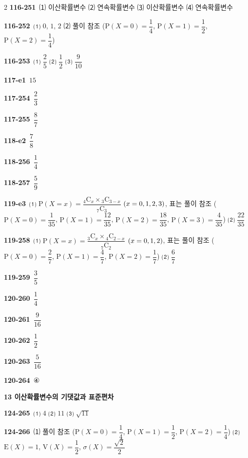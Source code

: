 \documentclass[10pt,a4paper]{article}
\begin{document}
\begin{multicols}{2}
\noindent\textbf{116-251}\ ⑴ 이산확률변수 ⑵ 연속확률변수 ⑶ 이산확률변수 ⑷ 연속확률변수\par
\noindent\textbf{116-252}\ ⑴ $0$, $1$, $2$ ⑵ 풀이 참조 ($\mathrm{P}(X=0)=\dfrac{1}{4}$, $\mathrm{P}(X=1)=\dfrac{1}{2}$, $\mathrm{P}(X=2)=\dfrac{1}{4}$)\par
\noindent\textbf{116-253}\ ⑴ $\dfrac{2}{5}$ ⑵ $\dfrac{1}{2}$ ⑶ $\dfrac{9}{10}$\par
\noindent\textbf{117-e1}\ $15$\par
\noindent\textbf{117-254}\ $\dfrac{2}{3}$\par
\noindent\textbf{117-255}\ $\dfrac{8}{7}$\par
\noindent\textbf{118-e2}\ $\dfrac{7}{8}$\par
\noindent\textbf{118-256}\ $\dfrac{1}{4}$\par
\noindent\textbf{118-257}\ $\dfrac{5}{9}$\par
\noindent\textbf{119-e3}\ ⑴ $\mathrm{P}(X=x)=\dfrac{{}_4\mathrm{C}_x\times{}_3\mathrm{C}_{3-x}}{{}_7\mathrm{C}_3}$ $(x=0{,}\mkern3mu\mathopen{}1{,}\mkern3mu\mathopen{}2{,}\mkern3mu\mathopen{}3)$, 표는 풀이 참조 ($\mathrm{P}(X=0)=\dfrac{1}{35}$, $\mathrm{P}(X=1)=\dfrac{12}{35}$, $\mathrm{P}(X=2)=\dfrac{18}{35}$, $\mathrm{P}(X=3)=\dfrac{4}{35}$) ⑵ $\dfrac{22}{35}$\par
\noindent\textbf{119-258}\ ⑴ $\mathrm{P}(X=x)=\dfrac{{}_3\mathrm{C}_x\times{}_4\mathrm{C}_{2-x}}{{}_7\mathrm{C}_2}$ $(x=0{,}\mkern3mu\mathopen{}1{,}\mkern3mu\mathopen{}2)$, 표는 풀이 참조 ($\mathrm{P}(X=0)=\dfrac{2}{7}$, $\mathrm{P}(X=1)=\dfrac{4}{7}$, $\mathrm{P}(X=2)=\dfrac{1}{7}$) ⑵ $\dfrac{6}{7}$\par
\noindent\textbf{119-259}\ $\dfrac{3}{5}$\par
\noindent\textbf{120-260}\ $\dfrac{1}{4}$\par
\noindent\textbf{120-261}\ $\dfrac{9}{16}$\par
\noindent\textbf{120-262}\ $\dfrac{1}{2}$\par
\noindent\textbf{120-263}\ $\dfrac{5}{16}$\par
\noindent\textbf{120-264}\ ④\par
\noindent\textbf{13 이산확률변수의 기댓값과 표준편차}\par\smallskip
\noindent\textbf{124-265}\ ⑴ $4$ ⑵ $11$ ⑶ $\sqrt{11}$\par
\noindent\textbf{124-266}\ ⑴ 풀이 참조 ($\mathrm{P}(X=0)=\dfrac{1}{4}$, $\mathrm{P}(X=1)=\dfrac{1}{2}$, $\mathrm{P}(X=2)=\dfrac{1}{4}$) ⑵ $\mathrm{E}(X)=1$, $\mathrm{V}(X)=\dfrac{1}{2}$, $\sigma(X)=\dfrac{\sqrt{2}}{2}$\par

\end{multicols}
\end{document}
